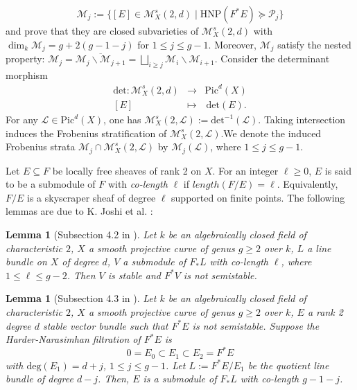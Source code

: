 \documentclass{kms-b}
\numberwithin{equation}{section}
\theoremstyle{plain}
\newtheorem{lemma}[theorem]{Lemma}
\theoremstyle{definition}
\theoremstyle{remark}
\begin{document}
\begin{equation*}
\mathcal{M}_j:= \big\{ [E]\in \mathcal{M}_X^s(2,d) \mid \mathrm{HNP}(F^*E)\succcurlyeq \mathscr{P}_j \big\}
\end{equation*}
and prove that they are closed subvarieties of $\mathcal{M}^s_X(2,d)$
with $\dim_k \mathcal{M}_j= g+2(g-1-j)$ for $1 \leqslant j \leqslant g-1$.
Moreover, $\mathcal{M}_j$ satisfy the nested property: $\mathcal{M}_{j}=\overline{\mathcal{M}_{j}\backslash \mathcal{M}_{j+1}} = \bigsqcup_{i \geqslant j} \mathcal{M}_i \backslash \mathcal{M}_{i+1}$.
Consider the determinant morphism
\begin{eqnarray}
    \mathrm{det}: \mathcal{M}^s_X(2,d) &\longrightarrow &  \mathrm{Pic}^d(X) \nonumber \\
  \left[ E \right]  \quad \, &  \longmapsto &   \, \mathrm{det}(E). \nonumber
\end{eqnarray}
For any $\mathcal{L} \in \mathrm{Pic}^d(X)$, one has $\mathcal{M}^s_X(2,\mathcal{L}):=\mathrm{det}^{-1}(\mathcal{L})$.
Taking intersection induces the Frobenius stratification of $\mathcal{M}^s_X(2, \mathcal{L})$.We denote the induced Frobenius strata 
$\mathcal{M}_j \cap \mathcal{M}^s_X(2,\mathcal{L})$ by $\mathcal{M}_j(\mathcal{L})$, where $1 \leqslant j \leqslant g-1$.

Let $E\subseteq F$ be locally free sheaves of rank 2 on $X$. For an integer $\ell \geqslant 0$,
$E$ is said to be a submodule of $F$ with \emph{co-length} $\ell$ if $length(F/E)=\ell$. Equivalently, $F/E$ is a skyscraper sheaf of degree $\ell$ supported on finite points. The following lemmas are due to K. Joshi et al. \cite{JRXY06}:
\begin{lemma}[Subsection 4.2 in \cite{JRXY06}]\label{lemma3}
    Let $k$ be an algebraically closed field of characteristic $2$, $X$ a smooth projective curve of genus $g\geqslant 2$ over $k$, $L$ a line bundle on $X$ of degree $d$, $V$ a submodule of $F_*L$ with co-length $\ell$, where $1 \leqslant \ell \leqslant g-2$. Then $V$ is stable and $F^*V$ is not semistable.
\end{lemma}
\begin{lemma}[Subsection 4.3 in \cite{JRXY06}]\label{lemma4}
Let $k$ be an algebraically closed field of characteristic $2$, $X$ a smooth projective curve of genus $g\geqslant 2$ over $k$, $E$  a rank 2 degree $d$ stable vector bundle such that $F^*E$ is not semistable. Suppose the Harder-Narasimhan filtration of $F^*E$ is 
$$0= E_0\subset E_1 \subset E_2=F^*E$$
with $\mathrm{deg}(E_1)=d+j$, $1 \leqslant j \leqslant g-1$. Let $L:=F^*E/E_1$ be the quotient line bundle of degree $d-j$. Then, $E$ is a submodule of $F_*L$ with co-length $g-1-j$.
\end{lemma}
 
\end{document}
